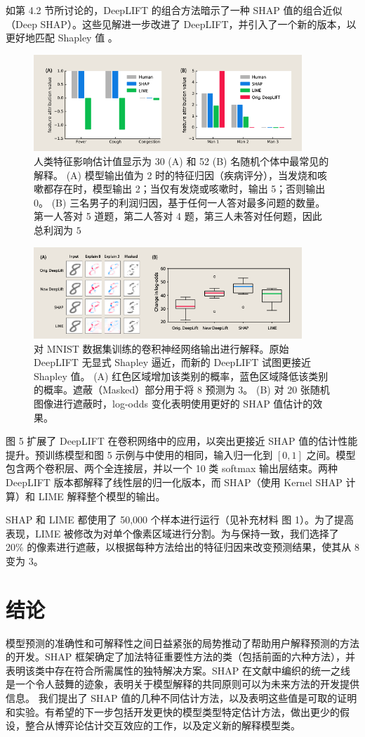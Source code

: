 \documentclass[12pt, a4paper]{ctexart} %
\begin{document}
如第 4.2 节所讨论的，DeepLIFT 的组合方法暗示了一种 SHAP 值的组合近似（Deep SHAP）。这些见解进一步改进了 DeepLIFT，并引入了一个新的版本，以更好地匹配 Shapley 值 \cite{deeplift_shap}。

\begin{figure}[h]
    \centering
    \includegraphics[width=0.9\textwidth]{./img/img_4.png}
    \caption{人类特征影响估计值显示为 30 (A) 和 52 (B) 名随机个体中最常见的解释。
    (A) 模型输出值为 2 时的特征归因（疾病评分），当发烧和咳嗽都存在时，模型输出 2；当仅有发烧或咳嗽时，输出 5；否则输出 0。
    (B) 三名男子的利润归因，基于任何一人答对最多问题的数量。第一人答对 5 道题，第二人答对 4 题，第三人未答对任何题，因此总利润为 $5$}
\end{figure}

\begin{figure}[h]
    \centering
    \includegraphics[width=0.9\textwidth]{./img/img_5.png}
    \caption{对 MNIST 数据集训练的卷积神经网络输出进行解释。原始 DeepLIFT 无显式 Shapley 逼近，而新的 DeepLIFT 试图更接近 Shapley 值。
    (A) 红色区域增加该类别的概率，蓝色区域降低该类别的概率。遮蔽（Masked）部分用于将 8 预测为 3。
    (B) 对 20 张随机图像进行遮蔽时，log-odds 变化表明使用更好的 SHAP 值估计的效果。}
\end{figure}

\noindent 图 5 扩展了 DeepLIFT 在卷积网络中的应用，以突出更接近 SHAP 值的估计性能提升。预训练模型和图 5 示例与中使用的相同，输入归一化到 $[0,1]$ 之间。模型包含两个卷积层、两个全连接层，并以一个 10 类 softmax 输出层结束。两种 DeepLIFT 版本都解释了线性层的归一化版本，而 SHAP（使用 Kernel SHAP 计算）和 LIME 解释整个模型的输出。

SHAP 和 LIME 都使用了 50,000 个样本进行运行（见补充材料 图 1）。为了提高表现，LIME 被修改为对单个像素区域进行分割。为与保持一致，我们选择了 20\% 的像素进行遮蔽，以根据每种方法给出的特征归因来改变预测结果，使其从 8 变为 3。

\section{结论}
模型预测的准确性和可解释性之间日益紧张的局势推动了帮助用户解释预测的方法的开发。SHAP 框架确定了加法特征重要性方法的类（包括前面的六种方法），并表明该类中存在符合所需属性的独特解决方案。SHAP 在文献中编织的统一之线是一个令人鼓舞的迹象，表明关于模型解释的共同原则可以为未来方法的开发提供信息。 我们提出了 SHAP 值的几种不同估计方法，以及表明这些值是可取的证明和实验。有希望的下一步包括开发更快的模型类型特定估计方法，做出更少的假设，整合从博弈论估计交互效应的工作，以及定义新的解释模型类。
\end{document}
